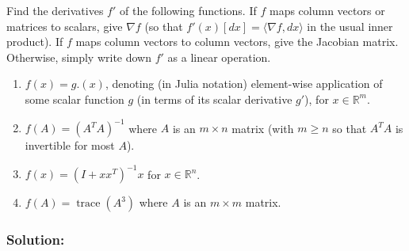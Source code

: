 \documentclass[10pt,oneside]{article}
\newcommand{\tr}{\operatorname{trace}}
\begin{document}
Find the derivatives $f'$ of the following functions.  If $f$ maps column vectors or matrices to scalars, give $\nabla f$ (so that $f'(x)[dx] = \langle \nabla f,  dx\rangle$ in the usual inner product). If $f$ maps column vectors to column vectors, give the Jacobian matrix.  Otherwise, simply write down $f'$ as a linear operation.

\begin{enumerate}

\item $f(x) = g.(x)$, denoting (in Julia notation) element-wise application of some scalar function $g$ (in terms of its scalar derivative $g'$), for $x \in \mathbb{R}^m$.

\item $f(A) = (A^T A)^{-1}$ where $A$ is an $m \times n$ matrix (with $m \ge n$ so that $A^T A$ is invertible for most $A$).

\item $f(x) = (I + x x^T)^{-1} x$ for $x \in \mathbb{R}^n$.

\item $f(A) = \tr(A^3)$ where $A$ is an $m \times m$ matrix.

\end{enumerate}

\subsubsection*{Solution:}
\end{document}
